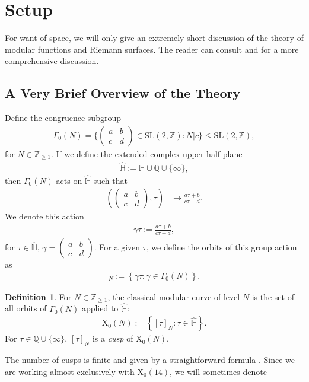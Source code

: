 \documentclass[reqno]{amsart}
\theoremstyle{definition}
\newtheorem{definition}[theorem]{Definition}
\theoremstyle{remark}
\numberwithin{equation}{section}
\begin{document}
\section{Setup}\label{sectionsetup}

For want of space, we will only give an extremely short discussion of the theory of modular functions and Riemann surfaces.  The reader can consult \cite{Diamond} and \cite{Knopp} for a more comprehensive discussion.

\subsection{A Very Brief Overview of the Theory}
Define the congruence subgroup
\begin{align*}
\Gamma_0(N) = \Bigg\{ \begin{pmatrix}
  a & b \\
  c & d 
 \end{pmatrix}\in \mathrm{SL}(2,\mathbb{Z}) : N|c \Bigg\}\le\mathrm{SL}(2,\mathbb{Z}),
\end{align*} for $N\in\mathbb{Z}_{\ge 1}$. If we define the extended complex upper half plane %
\begin{align*}
\hat{\mathbb{H}} := \mathbb{H}\cup\mathbb{Q}\cup\{\infty\},
\end{align*} then $\Gamma_0(N)$ acts on $\hat{\mathbb{H}}$ such that
\begin{align*}
\left(\begin{pmatrix}
  a & b \\
  c & d 
 \end{pmatrix},\tau\right)&\longrightarrow \frac{a\tau+b}{c\tau+d}.
\end{align*}  We denote this action
\begin{align*}
\gamma\tau := \frac{a\tau+b}{c\tau+d},
\end{align*} for $\tau\in\hat{\mathbb{H}}$, $\gamma=\begin{pmatrix}
  a & b \\
  c & d 
 \end{pmatrix}$.  For a given $\tau$, we define the orbits of this group action as
\begin{align*}
[\tau]_N := \left\{ \gamma\tau: \gamma\in\Gamma_0(N) \right\}.
\end{align*}
\begin{definition}
For $N\in\mathbb{Z}_{\ge 1}$, the classical modular curve of level $N$ is the set of all orbits of $\Gamma_0(N)$ applied to $\hat{\mathbb{H}}$:
\begin{align*}
\mathrm{X}_0(N):=\left\{ [\tau]_N : \tau\in\hat{\mathbb{H}} \right\}.
\end{align*}  For $\tau\in\mathbb{Q}\cup\{\infty\}$, $[\tau]_N$ is a \textit{cusp} of $\mathrm{X}_0(N)$.
\end{definition}  The number of cusps is finite and given by a straightforward formula \cite[Figure 3.3]{Diamond}.  Since we are working almost exclusively with $\mathrm{X}_0(14)$, we will sometimes denote
\end{document}
